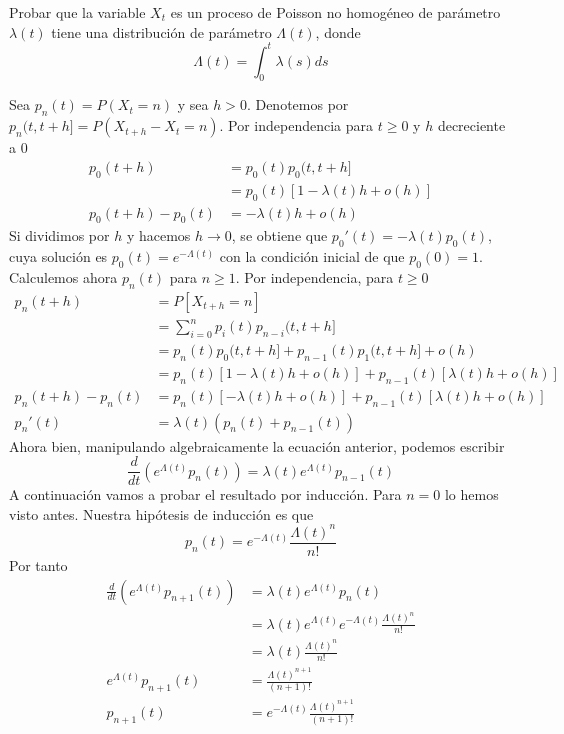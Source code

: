 \documentclass[twoside]{article}
\begin{document}
\begin{ejercicio}{11}
Probar que la variable $X_{t}$ es un proceso de Poisson no homogéneo de parámetro $\lambda(t)$ tiene una distribución de parámetro $\Lambda(t)$, donde
	$$ \Lambda(t) = \int_{0}^{t} \lambda(s) ds$$	
\end{ejercicio}
\begin{solucion}
Sea $p_{n}(t) = P(X_{t} = n ) $ y sea $h>0$. Denotemos por $p_{n} (t,t+h] =P(X_{t+h}-X_{t}=n)$. Por independencia para $ t \geq 0$ y $h$ decreciente a 0
\begin{align*}
p_{0}(t+h)&= p_{0}(t) p_{0}(t,t+h]\\
& = p_{0}(t)[1- \lambda(t)h +o(h)]\\
p_0(t+h)-p_0(t) &= -\lambda(t)h + o(h)
\end{align*}
Si dividimos por $h$ y hacemos $h\to 0$, se obtiene que $p_{0}'(t) = -\lambda(t)p_{0}(t)$, cuya solución es $p_{0}(t)=e^{-\Lambda(t)}$ con la condición inicial de que $p_0(0)=1$. Calculemos ahora $p_{n}(t)$ para $n \geq 1$. Por independencia, para $t \geq 0$
\begin{align*}
p_n(t+h)&=P[X_{t+h}=n]\\
&=\sum_{i=0}^n p_i(t)p_{n-i}(t,t+h]\\
&= p_n(t)p_0(t,t+h] + p_{n-1}(t)p_1(t,t+h]+o(h)\\
&= p_{n}(t) [1- \lambda(t)h +o(h)] + p_{n-1}(t)[\lambda(t)h+o(h)] \\
p_n(t+h) - p_n(t) &= p_n(t)[-\lambda(t)h+o(h)]+p_{n-1}(t)[\lambda(t)h+o(h)]\\
p_n'(t)&=\lambda(t)(p_n(t)+p_{n-1}(t))
\end{align*}
Ahora bien, manipulando algebraicamente la ecuación anterior, podemos escribir
$$
\frac{d}{dt}\left(e^{\Lambda(t)}p_n(t)\right) = \lambda(t)e^{\Lambda(t)}p_{n-1}(t)
$$
A continuación vamos a probar el resultado por inducción. Para $n=0$ lo hemos visto antes. Nuestra hipótesis de inducción es que
$$
p_n(t)=e^{-\Lambda(t)}\frac{\Lambda(t)^n}{n!}
$$
Por tanto
\begin{align*}
\frac{d}{dt}\left(e^{\Lambda(t)}p_{n+1}(t)\right) &= \lambda(t)e^{\Lambda(t)}p_{n}(t)\\
&= \lambda(t)e^{\Lambda(t)}e^{-\Lambda(t)}\frac{\Lambda(t)^n}{n!}\\
&=\lambda(t)\frac{\Lambda(t)^n}{n!}\\
e^{\Lambda(t)}p_{n+1}(t) &= \frac{\Lambda(t)^{n+1}}{(n+1)!}\\
p_{n+1}(t)&=e^{-\Lambda(t)}\frac{\Lambda(t)^{n+1}}{(n+1)!}
\end{align*}
\end{solucion}
\newpage
\end{document}
